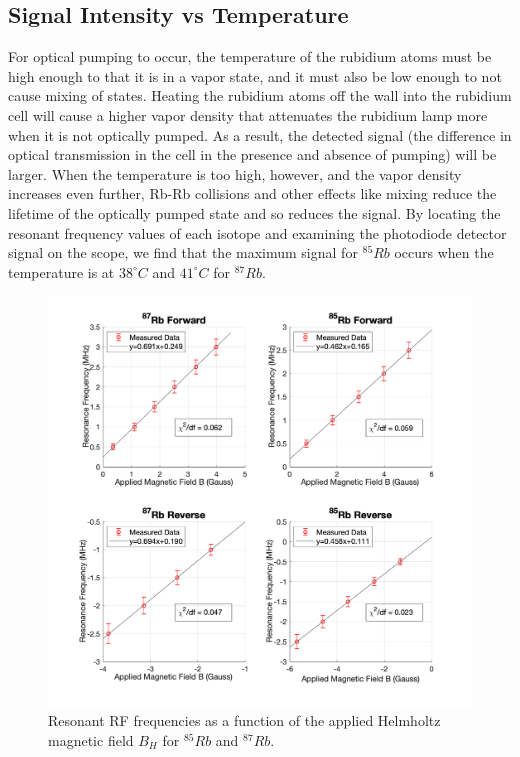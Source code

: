\documentclass[%
 aip,
rsi,%
 amsmath,amssymb,
 reprint,%
author-numerical,%
]{revtex4-1}
\begin{document}
\subsection{Signal Intensity vs Temperature}
For optical pumping to occur, the temperature of the rubidium atoms must be high enough to that it is in a vapor state, and it must also be low enough to not cause mixing of states. \newline
\indent Heating the rubidium atoms off the wall into the rubidium cell will cause a higher vapor density that attenuates the rubidium lamp more when it is not optically pumped. As a result, the detected signal (the difference in optical transmission in the cell in the presence and absence of pumping) will be larger. When the temperature is too high, however, and the vapor density increases even further, Rb-Rb collisions and other effects like mixing reduce the lifetime of the optically pumped state and so reduces the signal. \newline
\indent By locating the resonant frequency values of each isotope and examining the photodiode detector signal on the scope, we find that the maximum signal for $^{85}Rb$ occurs when the temperature is at $38^{\circ}C$ and  $41^{\circ}C$ for $^{87}Rb$. 

\begin{figure}
\includegraphics[width=1\linewidth]{lateximages/linear.png} 
\caption{\label{fig:linear}  Resonant RF frequencies as a function of the applied Helmholtz magnetic field $B_{H}$ for $^{85}Rb$ and $^{87}Rb$. }
\end{figure}
\end{document}
